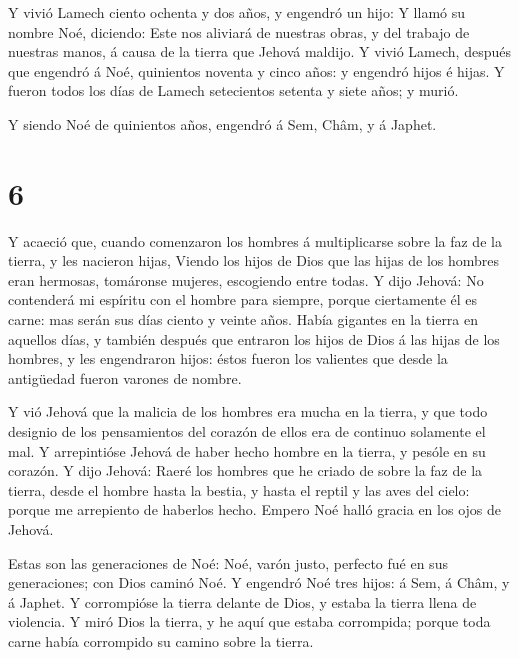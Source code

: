  Y vivió Lamech ciento ochenta y dos años, y engendró un
hijo:  Y llamó su nombre Noé, diciendo: Este nos aliviará
de nuestras obras, y del trabajo de nuestras manos, á causa de la tierra
que Jehová maldijo.  Y vivió Lamech, después que engendró á
Noé, quinientos noventa y cinco años: y engendró hijos é hijas.
 Y fueron todos los días de Lamech setecientos setenta y
siete años; y murió.

 Y siendo Noé de quinientos años, engendró á Sem, Châm, y á
Japhet.

\hypertarget{section-5}{%
\section{6}\label{section-5}}

 Y acaeció que, cuando comenzaron los hombres á
multiplicarse sobre la faz de la tierra, y les nacieron hijas,
 Viendo los hijos de Dios que las hijas de los hombres eran
hermosas, tomáronse mujeres, escogiendo entre todas.  Y dijo
Jehová: No contenderá mi espíritu con el hombre para siempre, porque
ciertamente él es carne: mas serán sus días ciento y veinte años.
 Había gigantes en la tierra en aquellos días, y también
después que entraron los hijos de Dios á las hijas de los hombres, y les
engendraron hijos: éstos fueron los valientes que desde la antigüedad
fueron varones de nombre.

 Y vió Jehová que la malicia de los hombres era mucha en la
tierra, y que todo designio de los pensamientos del corazón de ellos era
de continuo solamente el mal.  Y arrepintióse Jehová de
haber hecho hombre en la tierra, y pesóle en su corazón.  Y
dijo Jehová: Raeré los hombres que he criado de sobre la faz de la
tierra, desde el hombre hasta la bestia, y hasta el reptil y las aves
del cielo: porque me arrepiento de haberlos hecho.  Empero
Noé halló gracia en los ojos de Jehová.

 Estas son las generaciones de Noé: Noé, varón justo,
perfecto fué en sus generaciones; con Dios caminó Noé.  Y
engendró Noé tres hijos: á Sem, á Châm, y á Japhet.  Y
corrompióse la tierra delante de Dios, y estaba la tierra llena de
violencia.  Y miró Dios la tierra, y he aquí que estaba
corrompida; porque toda carne había corrompido su camino sobre la
tierra.

